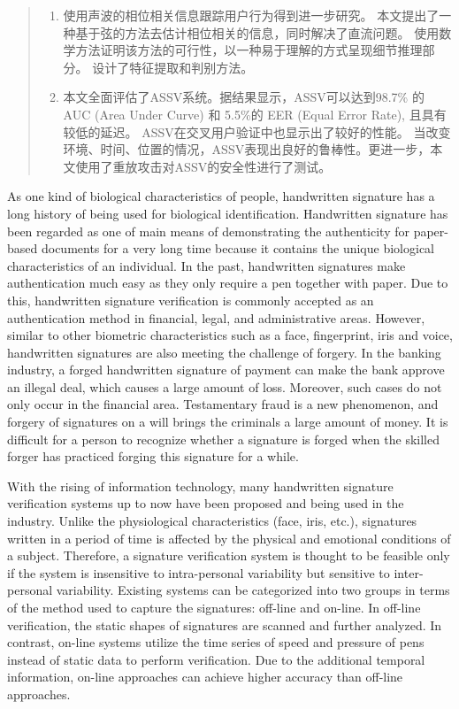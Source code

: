 \begin{abstract}
\begin{enumerate}[label=(\arabic*)]
    \item 使用声波的相位相关信息跟踪用户行为得到进一步研究。 本文提出了一种基于弦的方法去估计相位相关的信息，同时解决了直流问题。 使用数学方法证明该方法的可行性，以一种易于理解的方式呈现细节推理部分。 设计了特征提取和判别方法。
    
    \item 本文全面评估了ASSV系统。据结果显示，ASSV可以达到98.7\% 的 AUC (Area Under Curve) 和 5.5\%的 EER (Equal Error Rate), 且具有较低的延迟。 ASSV在交叉用户验证中也显示出了较好的性能。 当改变环境、时间、位置的情况，ASSV表现出良好的鲁棒性。更进一步，本文使用了重放攻击对ASSV的安全性进行了测试。
\end{enumerate}


\end{abstract}
\begin{englishabstract}

As one kind of biological characteristics of people, handwritten signature has a long history of being used for biological identification. Handwritten signature has been regarded as one of main means of demonstrating the authenticity for paper-based
documents for a very long time because it contains the unique biological characteristics of an individual. In the past, handwritten signatures make authentication much easy as they only require a pen together with paper. Due to this, handwritten signature verification is commonly accepted as an authentication method in financial, legal, and administrative areas. However, similar to other biometric characteristics such as a face, fingerprint, iris and voice, handwritten signatures are also meeting the challenge of forgery. In the banking industry, a forged handwritten signature of payment can make the bank approve an illegal deal, which causes a large amount of loss. Moreover, such cases do not only occur in the financial area. Testamentary fraud is a new phenomenon, and forgery of signatures on a will brings the criminals a large amount of money. It is difficult for a person to recognize whether a signature is forged when the skilled forger has practiced forging this signature for a while.

With the rising of information technology, many handwritten signature verification systems up to now have been proposed and being used in the industry. Unlike the physiological characteristics (face, iris, etc.), signatures written in a period of time is affected by the physical and emotional conditions of a subject. Therefore, a signature verification system is thought to be feasible only if the system is insensitive to intra-personal variability but sensitive to inter-personal variability. Existing systems can be categorized into two groups in terms of the method used to capture the signatures: off-line and on-line. In off-line verification, the static shapes of signatures are scanned and further analyzed. In contrast, on-line systems utilize the time series of speed and pressure of pens instead of static data to perform verification. Due to the additional temporal information, on-line approaches can achieve higher accuracy than off-line approaches.


\end{englishabstract}
